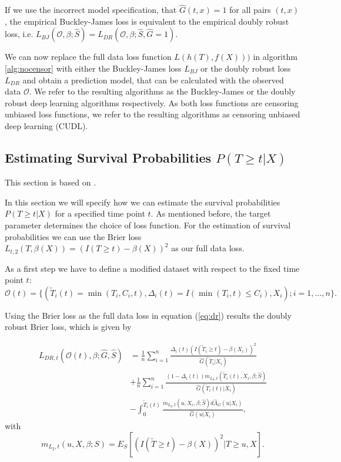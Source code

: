 \documentclass[12pt, a4paper]{article}
\theoremstyle{definition}
\theoremstyle{plain}
\numberwithin{equation}{section}
\numberwithin{figure}{section}
\numberwithin{table}{section}
\begin{document}
	If we use the incorrect model specification, that $\hat{G}(t,x)=1$ for all pairs $(t,x)$, the empirical  Buckley-James loss is equivalent to the empirical doubly robust loss, i.e. $L_{BJ}(\mathcal{O}, \beta; \hat{S})=L_{DR}(\mathcal{O}, \beta; \hat{S}, \hat{G} = 1)$.
	
	We can now replace the full data loss function $L(h(T), f(X)))$ in algorithm \ref{alg:nocensor} with either the Buckley-James loss $L_{BJ}$ or the doubly robust loss $L_{DR}$ and obtain a prediction model, that can be calculated with the observed data $\mathcal{O}$.
	We refer to the resulting algorithms as the Buckley-James or the doubly robust deep learning algorithms respectively.
	As both loss functions are censoring unbiased loss functions, we refer to the resulting algorithms as censoring unbiased deep learning (CUDL). 
	
	\subsection{Estimating Survival Probabilities $P(T\geq t \vert X)$}
	
	This section is based on \citet*{basearticle}.
	
	In this section we will specify how we can estimate the survival probabilities $P(T\geq t \vert X)$ for a specified time point $t$.
	As mentioned before, the target parameter determines the choice of loss function.
	For the estimation of survival probabilities we can use the Brier loss $L_{t,2}(T, \beta(X)) = (I(T \geq t) - \beta(X))^2$ as our full data loss.
	
	As a first step we have to define a modified dataset with respect to the fixed time point $t$:
	\begin{equation*}
		\mathcal{O}(t) = \{(\tilde{T}_i(t)=\min(T_i, C_i, t), \Delta_i(t) = I(\min(T_i, t) \leq C_i), X_i); i = 1,\dots,n\}.
	\end{equation*}
	
	Using the Brier loss as the full data loss in equation (\ref{eq:dr}) results the doubly robust Brier loss, which is given by
	
	\begin{equation*}
	\begin{split}
		L_{DR, t}(\mathcal{O}(t),\beta; \hat{G},\hat{S}) &=  \frac{1}{n} \sum_{i=1}^n \frac{\Delta_i(t)(I(\tilde{T}_i \geq t)-\beta(X_i))^2}{\hat{G}(\tilde{T}_i \vert X_i)}\\
		& + \frac{1}{n} \sum_{i=1}^n \frac{(1-\Delta_i(t))m_{L_2,t}(\tilde{T}_i(t),X_i,\beta; \hat{S})}{\hat{G}(\tilde{T}_i(t) \vert X_i)}\\
		& - \int_{0}^{\tilde{T}_i(t)} \frac{m_{L_2,t}(u,X_i,\beta; \hat{S})d\hat{\Lambda}_G(u\vert X_i)}{\hat{G}(u \vert X_i)},
	\end{split}
	\end{equation*}
	 with
	 \begin{equation*}
	 	m_{L_2,t}(u,X,\beta;S) = E_S[(I(\tilde{T}\geq t)-\beta(X))^2 \vert T \geq u, X].
	 \end{equation*}
	
\end{document}
